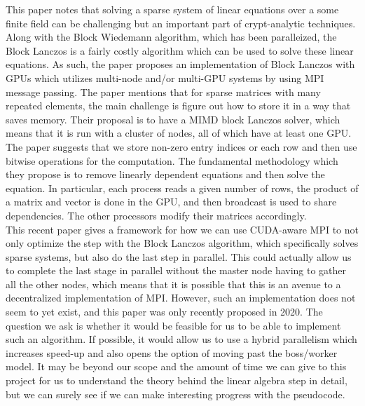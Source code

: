 \documentclass[11pt,twocolumn]{article}
\begin{document}
This paper notes that solving a sparse system of linear equations over a some finite field can be challenging but an important part of crypt-analytic techniques. Along with the Block Wiedemann algorithm, which has been paralleized, the Block Lanczos is a fairly costly algorithm which can be used to solve these linear equations. As such, the paper proposes an implementation of Block Lanczos with GPUs which utilizes multi-node and/or multi-GPU systems by using MPI message passing. The paper mentions that for sparse matrices with many repeated elements, the main challenge is figure out how to store it in a way that saves memory. Their proposal is to have a MIMD block Lanczos solver, which means that it is run with a cluster of nodes, all of which have at least one GPU. The paper suggests that we store non-zero entry indices or each row and then use bitwise operations for the computation. The fundamental methodology which they propose is to remove linearly dependent equations and then solve the equation. In particular, each process reads a given number of rows, the product of a matrix and vector is done in the GPU, and then broadcast is used to share dependencies. The other processors modify their matrices accordingly. \\
\indent This recent paper gives a framework for how we can use CUDA-aware MPI to not only optimize the step with the Block Lanczos algorithm, which specifically solves sparse systems, but also do the last step in parallel. This could actually allow us to complete the last stage in parallel without the master node having to gather all the other nodes, which means that it is possible that this is an avenue to a decentralized implementation of MPI. However, such an implementation does not seem to yet exist, and this paper was only recently proposed in 2020. The question we ask is whether it would be feasible for us to be able to implement such an algorithm. If possible, it would allow us to use a hybrid parallelism which increases speed-up and also opens the option of moving past the boss/worker model. It may be beyond our scope and the amount of time we can give to this project for us to understand the theory behind the linear algebra step in detail, but we can surely see if we can make interesting progress with the pseudocode. \\
\end{document}
